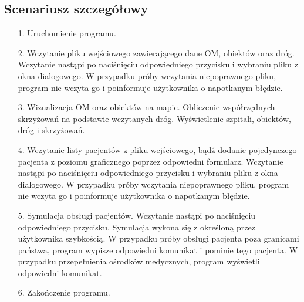 \documentclass[]{article}
\begin{document}
    \subsection{Scenariusz szczegółowy} %
    \begin{enumerate}
        \item[1.] Uruchomienie programu.
        \item[2.] Wczytanie pliku wejściowego zawierającego dane OM, obiektów oraz dróg.
            \subitem[2.1.] Wczytanie nastąpi po naciśnięciu odpowiedniego przycisku i wybraniu pliku z okna dialogowego.
            \subitem[2.2.] W przypadku próby wczytania niepoprawnego pliku, program nie wczyta go i poinformuje użytkownika o napotkanym błędzie.
        \item[3.] Wizualizacja OM oraz obiektów na mapie.
            \subitem[3.1.] Obliczenie współrzędnych skrzyżowań na podstawie wczytanych dróg.
            \subitem[3.2.] Wyświetlenie szpitali, obiektów, dróg i skrzyżowań.
        \item[4.] Wczytanie listy pacjentów z pliku wejściowego, bądź dodanie pojedynczego pacjenta z poziomu graficznego poprzez odpowiedni formularz.
            \subitem[4.1.] Wczytanie nastąpi po naciśnięciu odpowiedniego przycisku i wybraniu pliku z okna dialogowego.
            \subitem[4.2.] W przypadku próby wczytania niepoprawnego pliku, program nie wczyta go i poinformuje użytkownika o napotkanym błędzie.
        \item [5.]Symulacja obsługi pacjentów.
            \subitem[5.1.] Wczytanie nastąpi po naciśnięciu odpowiedniego przycisku.
            \subitem[5.2.] Symulacja wykona się z określoną przez użytkownika szybkością.
            \subitem[5.3.] W przypadku próby obsługi pacjenta poza granicami państwa, program wypisze odpowiedni komunikat i pominie tego pacjenta.
            \subitem[5.4.] W przypadku przepełnienia ośrodków medycznych, program wyświetli odpowiedni komunikat.
        \item[6.] Zakończenie programu.
    \end{enumerate}
        
\end{document}
